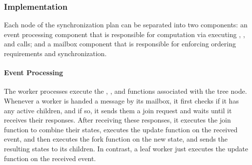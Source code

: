\subsubsection{Implementation}
\label{ssec:runtime}

Each node of the synchronization plan can be separated into two
components: an event processing component that is responsible for
computation via executing ,
, and  calls; and a mailbox
component that is responsible for enforcing ordering requirements and
synchronization.


\paragraph{Event Processing}
%
The worker processes execute the ,
, and  functions associated
with the tree node.  Whenever a worker is handed a message
by its mailbox, it first checks if it has any active children, and if
so, it sends them a join request and waits until it receives their
responses. After receiving these responses, it executes the join
function to combine their states, executes the update function on the
received event, and then executes the fork function on the new state,
and sends the resulting states to its children. In contrast, a leaf
worker just executes the update function on the received
event.




